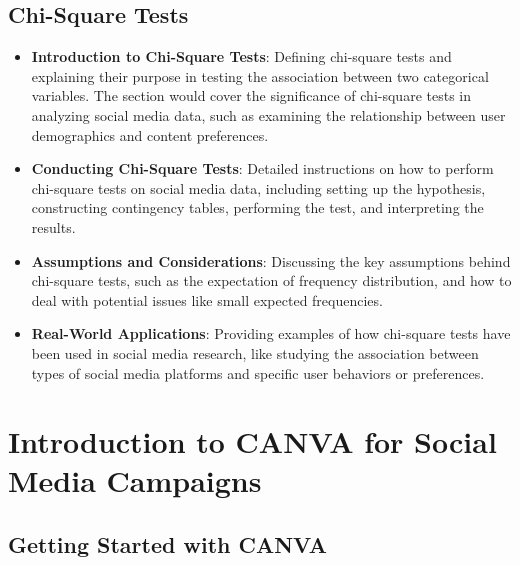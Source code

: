 \documentclass[
]{book}
\providecommand{\tightlist}{%
  \setlength{\itemsep}{0pt}\setlength{\parskip}{0pt}}
\begin{document}
\hypertarget{chi-square-tests}{%
\section*{Chi-Square Tests}\label{chi-square-tests}}

\begin{itemize}
\tightlist
\item
  \textbf{Introduction to Chi-Square Tests}: Defining chi-square tests and explaining their purpose in testing the association between two categorical variables. The section would cover the significance of chi-square tests in analyzing social media data, such as examining the relationship between user demographics and content preferences.
\item
  \textbf{Conducting Chi-Square Tests}: Detailed instructions on how to perform chi-square tests on social media data, including setting up the hypothesis, constructing contingency tables, performing the test, and interpreting the results.
\item
  \textbf{Assumptions and Considerations}: Discussing the key assumptions behind chi-square tests, such as the expectation of frequency distribution, and how to deal with potential issues like small expected frequencies.
\item
  \textbf{Real-World Applications}: Providing examples of how chi-square tests have been used in social media research, like studying the association between types of social media platforms and specific user behaviors or preferences.
\end{itemize}

\hypertarget{introduction-to-canva-for-social-media-campaigns}{%
\chapter{Introduction to CANVA for Social Media Campaigns}\label{introduction-to-canva-for-social-media-campaigns}}

\hypertarget{getting-started-with-canva}{%
\section*{Getting Started with CANVA}\label{getting-started-with-canva}}
\end{document}
